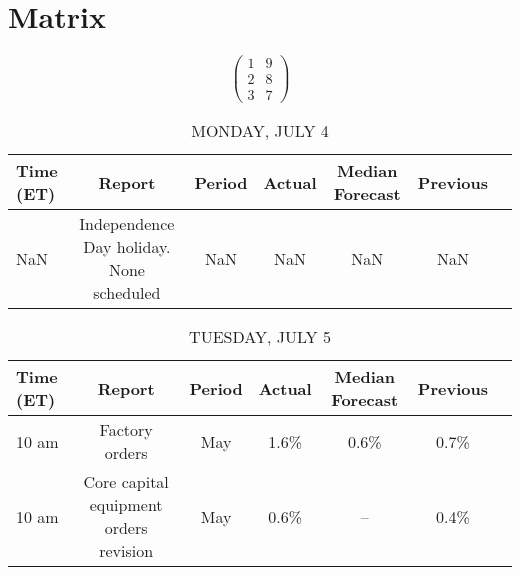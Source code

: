 \documentclass{article}%
\begin{document}
%
\normalsize%
\section{Matrix}%
\label{sec:Matrix}%
\[%
\begin{pmatrix}%
1&9\\%
2&8\\%
3&7%
\end{pmatrix}%
\]

%


\begin{table}[htbp]%
\caption{MONDAY, JULY 4}%
\centering%
\begin{adjustbox}{width=1\textwidth}%
\begin{tabular}{lcccccc}
\toprule
Time (ET) &                                   Report & Period & Actual & Median Forecast & Previous \\
\midrule
      NaN & Independence Day holiday. None scheduled &    NaN &    NaN &             NaN &      NaN \\
\bottomrule
\end{tabular}
%
\end{adjustbox}%
\end{table}

%


\begin{table}[htbp]%
\caption{TUESDAY, JULY 5}%
\centering%
\begin{adjustbox}{width=1\textwidth}%
\begin{tabular}{lcccccc}
\toprule
Time (ET) &                                 Report & Period & Actual & Median Forecast & Previous \\
\midrule
    10 am &                         Factory orders &    May &   1.6\% &            0.6\% &     0.7\% \\
    10 am & Core capital equipment orders revision &    May &   0.6\% &              -- &     0.4\% \\
\bottomrule
\end{tabular}
%
\end{adjustbox}%
\end{table}

%
\end{document}
